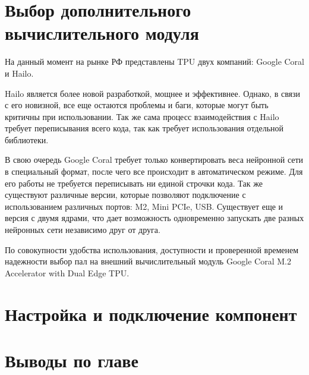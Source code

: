 \section{Выбор дополнительного вычислительного модуля}
На данный момент на рынке РФ представлены TPU двух компаний: Google Coral и Hailo. 

Hailo является более новой разработкой, мощнее и эффективнее. Однако, в связи с его новизной, все еще остаются проблемы и баги, которые могут быть критичны при использовании. Так же сама процесс взаимодействия с Hailo требует переписывания всего кода, так как требует использования отдельной библиотеки. 

В свою очередь Google Coral требует только конвертировать веса нейронной сети в специальный формат, после чего все происходит в автоматическом режиме. Для его работы не требуется переписывать ни единой строчки кода. 
Так же существуют различные версии, которые позволяют подключение с использованием различных портов: M2, Mini PCIe, USB. 
Существует еще и версия с двумя ядрами, что дает возможность одновременно запускать две разных нейронных сети независимо друг от друга. 

По совокупности удобства использования, доступности и проверенной временем надежности выбор пал на внешний вычислительный модуль Google Coral M.2 Accelerator with Dual Edge TPU. 

\section{Настройка и подключение компонент}

\section{Выводы по главе}